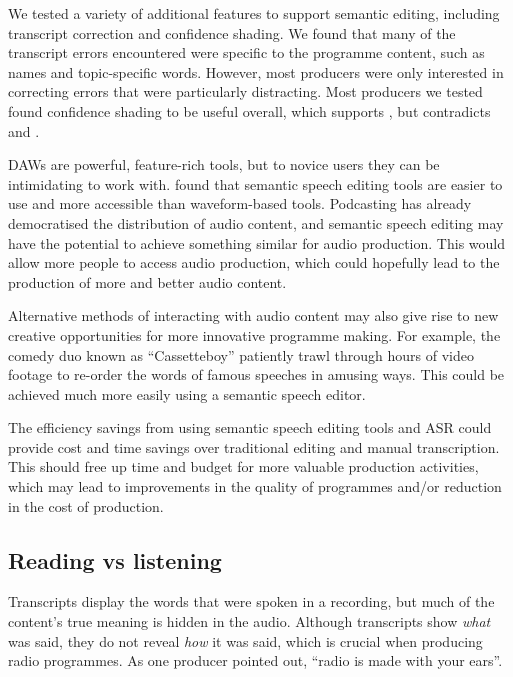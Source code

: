 We tested a variety of additional features to support semantic editing, including transcript correction and confidence
shading.
We found that many of the transcript errors encountered were specific to the
programme content, such as names and topic-specific words.  However, most producers were only interested in correcting
errors that were particularly distracting.  Most producers we tested found confidence shading to be useful overall,
which supports \citet{Burke2006}, but contradicts \citet{Suhm2001} and \citet{Vemuri2004}.






DAWs are powerful, feature-rich tools, but to novice users they can be intimidating to work with.
\citet{Yoon2014,Sivaraman2016} found that semantic speech editing tools are easier to use and more accessible than
waveform-based tools.  Podcasting has already democratised the distribution of audio content, and semantic speech
editing may have the potential to achieve something similar for audio production. This would allow more people to
access audio production, which could hopefully lead to the production of more and better audio content.

Alternative methods of interacting with audio content may also give rise to new creative opportunities for more
innovative programme making.  For example, the comedy duo known as ``Cassetteboy'' \citep{Perraudin2014} patiently
trawl through hours of video footage to re-order the words of famous speeches in amusing ways. This could be achieved
much more easily using a semantic speech editor.


The efficiency savings from using semantic speech editing tools and ASR could provide cost and time
savings over traditional editing and manual transcription.  This should free up time and budget for more valuable
production activities, which may lead to improvements in the quality of programmes and/or reduction in the cost of
production.


\subsection{Reading vs listening}

Transcripts display the words that were spoken in a recording, but much of the content's true meaning is hidden in the
audio. Although transcripts show \textit{what} was said, they do not reveal \textit{how} it was said, which is crucial
when producing radio programmes.  As one producer pointed out, ``radio is made with your ears''.

